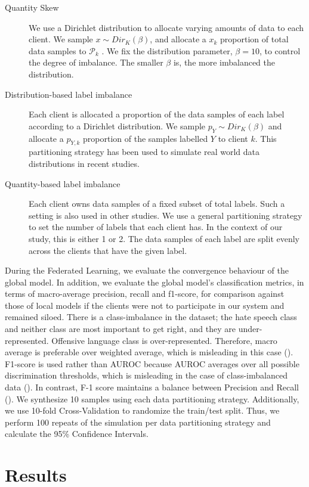 \documentclass[letterpaper]{article} %
\begin{document}
\begin{description}
\item[Quantity Skew] We use a Dirichlet distribution to allocate varying amounts of data to each client. We sample $x \sim Dir_K (\beta)$, and allocate a $x_k$ proportion of total data samples to ${\mathcal{P}}_k$ . We fix the distribution parameter, $\beta=10$, to control the degree of imbalance. The smaller $\beta$ is, the more imbalanced the distribution.
\item[Distribution-based label imbalance] Each client is allocated a proportion of the data samples of each label according to a Dirichlet distribution. We sample $p_Y \sim Dir_K(\beta)$ and allocate a $p_{Y,k}$ proportion of the samples labelled $Y$ to client $k$. This partitioning strategy has been used to simulate real world data distributions in recent studies.
\item[Quantity-based label imbalance] Each client owns data samples of a fixed subset of total labels. Such a setting is also used in other studies. We use a general partitioning strategy to set the number of labels that each client has. In the context of our study, this is either 1 or 2. The data samples of each label are split evenly across the clients that have the given label.
\end{description}


During the Federated Learning, we evaluate the convergence behaviour of the global model. In addition, we evaluate the global model's classification metrics, in terms of macro-average precision, recall and f1-score, for comparison against those of local models if the clients were not to participate in our system and remained siloed. There is a class-imbalance in the dataset; the hate speech class and neither class are most important to get right, and they are under-represented. Offensive language class is over-represented. Therefore, macro average is preferable over weighted average, which is misleading in this case (). F1-score is used rather than AUROC because AUROC averages over all possible discrimination thresholds, which is misleading in the case of class-imbalanced data (). In contrast, F-1 score maintains a balance between Precision and Recall (). We synthesize 10 samples using each data partitioning strategy. Additionally, we use 10-fold Cross-Validation to randomize the train/test split. Thus, we perform 100 repeats of the simulation per data partitioning strategy and calculate the 95\% Confidence Intervals.
\bigskip
\section{Results}
\end{document}
